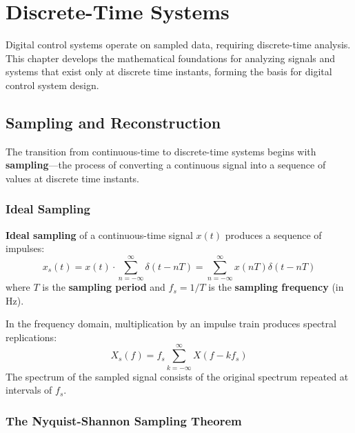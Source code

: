 \chapter{Discrete-Time Systems}
\label{ch:discrete}

Digital control systems operate on sampled data, requiring discrete-time analysis. This chapter develops the mathematical foundations for analyzing signals and systems that exist only at discrete time instants, forming the basis for digital control system design.

\section{Sampling and Reconstruction}

The transition from continuous-time to discrete-time systems begins with \textbf{sampling}---the process of converting a continuous signal into a sequence of values at discrete time instants.

\subsection{Ideal Sampling}

\begin{definitionbox}[title=Definition: Ideal Sampling]
\textbf{Ideal sampling} of a continuous-time signal $x(t)$ produces a sequence of impulses:
\begin{equation}
x_s(t) = x(t) \cdot \sum_{n=-\infty}^{\infty} \delta(t - nT) = \sum_{n=-\infty}^{\infty} x(nT) \delta(t - nT)
\end{equation}
where $T$ is the \textbf{sampling period} and $f_s = 1/T$ is the \textbf{sampling frequency} (in Hz).
\end{definitionbox}

In the frequency domain, multiplication by an impulse train produces spectral replications:
\begin{equation}
X_s(f) = f_s \sum_{k=-\infty}^{\infty} X(f - kf_s)
\end{equation}
The spectrum of the sampled signal consists of the original spectrum repeated at intervals of $f_s$.

\subsection{The Nyquist-Shannon Sampling Theorem}

